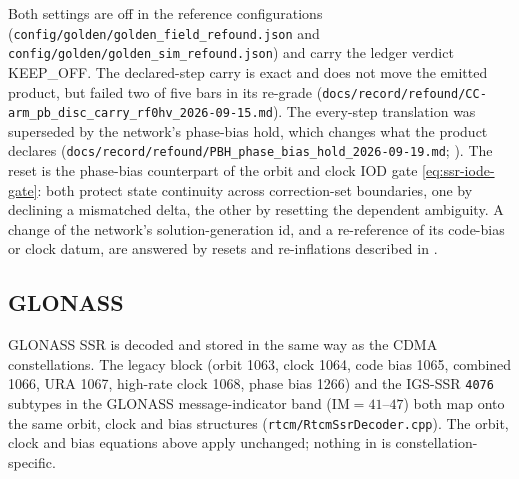 \documentclass[main.tex]{subfiles}
\begin{document}
Both settings are off in the reference configurations
(\texttt{config/golden/golden\_field\_refound.json} and
\texttt{config/golden/golden\_sim\_refound.json}) and carry the ledger
verdict KEEP\_OFF. The declared-step carry is exact and does not move the
emitted product, but failed two of five bars in its re-grade
(\texttt{docs/record/refound/CC-arm\_pb\_disc\_carry\_rf0hv\_2026-09-15.md}). The
every-step translation was superseded by the network's phase-bias hold,
which changes what the product declares
(\texttt{docs/record/refound/PBH\_phase\_bias\_hold\_2026-09-19.md};
). The reset is the phase-bias
counterpart of the orbit and clock IOD gate \eqref{eq:ssr-iode-gate}: both
protect state continuity across correction-set boundaries, one by declining a
mismatched delta, the other by resetting the dependent ambiguity. A change of
the network's solution-generation id, and a re-reference of its code-bias or
clock datum, are answered by resets and re-inflations described in
.

\subsection{GLONASS}\label{sec:ssr-glonass}

GLONASS SSR is decoded and stored in the same way as the CDMA
constellations. The legacy block (orbit 1063, clock 1064, code bias
1065, combined 1066, URA 1067, high-rate clock 1068, phase bias 1266)
and the IGS-SSR \texttt{4076} subtypes in the GLONASS
message-indicator band ($\mathrm{IM}=41$--$47$) both map onto the
same orbit, clock and bias structures
(\texttt{rtcm/RtcmSsrDecoder.cpp}). The orbit, clock and bias
equations above apply unchanged; nothing in
 is
constellation-specific.
\end{document}
